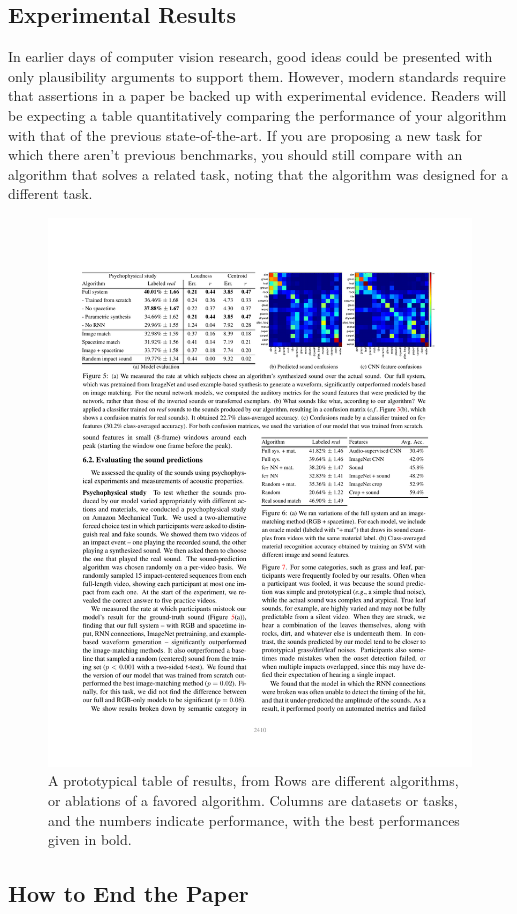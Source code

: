 \subsection{Experimental Results}
In earlier days of computer vision research, good ideas could be presented with only plausibility arguments to support them.  However,
modern standards require that assertions in a paper be backed up with experimental evidence.  Readers will be expecting a table quantitatively comparing the performance of your algorithm with that of the previous state-of-the-art.  If you are proposing a new task for which there aren't previous benchmarks, you should still compare with an algorithm that solves a related task, noting that the algorithm was designed for a different task.

\begin{figure}
    \centerline{
        \includegraphics[width=0.75\linewidth]{figures/papers/resultTable.pdf}}
    \caption{A prototypical table of results, from \cite{Owens2016}  Rows are different algorithms, or ablations of a favored algorithm. Columns are datasets or tasks, and the numbers indicate performance, with the best performances given in bold. }
    \label{resultsTable}
\end{figure}


\subsection{How to End the Paper}


